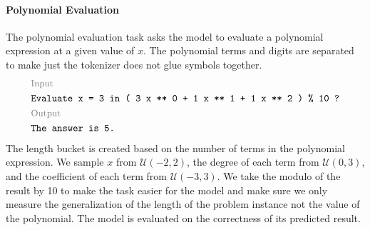 \documentclass{article}
\begin{document}
\paragraph{Polynomial Evaluation}
The polynomial evaluation task \citep{Nye2021:Scratchpad} asks the model to evaluate a polynomial expression at a given value of $x$. The polynomial terms and digits are separated to make just the tokenizer does not glue symbols together.
\[
  \begin{aligned}
     & \text{\footnotesize \color{gray} Input}                                 \\
     & \texttt{Evaluate x = 3  in  ( 3 x ** 0 + 1 x ** 1 + 1 x ** 2 ) \% 10 ?} \\
     & \text{\footnotesize \color{gray} Output}                                \\
     & \texttt{The answer is 5.}                                               \\
  \end{aligned}
\]
The length bucket is created based on the number of terms in the polynomial expression. We sample $x$ from $\mathcal{U}(-2, 2)$, the degree of each term from $\mathcal{U}(0,3)$, and the coefficient of each term from $\mathcal{U}(-3, 3)$. We take the modulo of the result by 10 to make the task easier for the model and make sure we only measure the generalization of the length of the problem instance not the value of the polynomial. The model is evaluated on the correctness of its predicted result.
\end{document}
